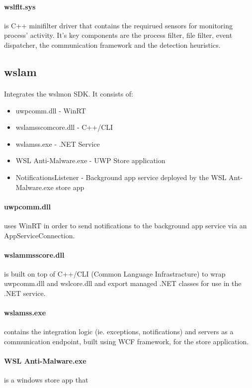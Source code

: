         \paragraph{wslflt.sys}
        is C++ minifilter driver that contains the requirued sensors for monitoring process' activity. It's key components are the
        process filter, file filter, event dispatcher, the communication framework and the detection heuristics.

    \subsection{wslam}
        \paragraph{}
        Integrates the wslmon SDK. It consists of:
        \begin{itemize}
            \item uwpcomm.dll - WinRT
            \item wslamsscomcore.dll - C++/CLI
            \item wslamss.exe - .NET Service
            \item WSL Anti-Malware.exe - UWP Store application
            \item NotificationsListener - Background app service deployed by the WSL Ant-Malware.exe store app
        \end{itemize}
        \paragraph{uwpcomm.dll} uses WinRT in order to send notifications to the background app service via an AppServiceConnection.
        \paragraph{wslammsscore.dll} is built on top of C++/CLI (Common Language Infrastracture) to wrap uwpcomm.dll and wslcore.dll and export managed .NET classes for use
        in the .NET service.
        \paragraph{wslamss.exe} contains the integration logic (ie. exceptions, notifications) and servers as a communication endpoint, built using WCF framework, for
        the store application.
        \paragraph{WSL Anti-Malware.exe}
        is a windows store app that 
